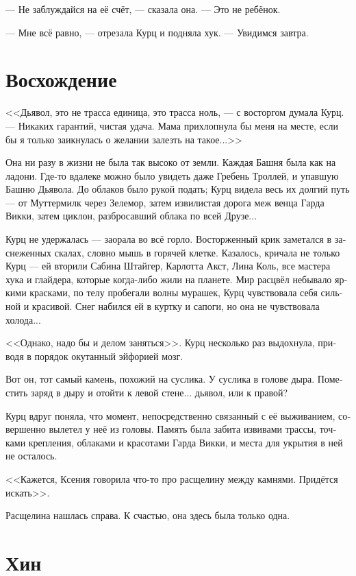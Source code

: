 \documentclass[a4paper,12pt,fleqn]{book}\usepackage{cooltooltips}\usepackage{polyglossia}\setdefaultlanguage[babelshorthands=true]{russian}\setotherlanguage{english}\defaultfontfeatures{Ligatures=TeX,Mapping=tex-text} \usepackage{xcolor}\definecolor{lightgray}{HTML}{bbbbbb}\color{lightgray}\newcommand{\ml}[3]{\textenglish{\textcolor{black}{#3}}}
\newcommand{\asterism}{\vspace{1em}{\centering\Large\bfseries$\ast~\ast~\ast$\par}\vspace{1em}}
\begin{document}
--- Не заблуждайся на её счёт, --- сказала она.
--- Это не ребёнок.

--- Мне всё равно, --- отрезала Курц и подняла хук.
--- Увидимся завтра.

\section{Восхождение}

<<Дьявол, это не трасса единица, это трасса ноль, --- с восторгом думала Курц.
--- Никаких гарантий, чистая удача.
Мама прихлопнула бы меня на месте, если бы я только заикнулась о желании залезть на такое...>>

\asterism

Она ни разу в жизни не была так высоко от земли.
Каждая Башня была как на ладони.
Где-то вдалеке можно было увидеть даже Гребень Троллей, и упавшую Башню Дьявола.
До облаков было рукой подать;
Курц видела весь их долгий путь --- от Муттермилк через Зелемор, затем извилистая дорога меж венца Гарда Викки, затем циклон, разбросавший облака по всей Друзе...

Курц не удержалась --- заорала во всё горло.
Восторженный крик заметался в заснеженных скалах, словно мышь в горячей клетке.
Казалось, кричала не только Курц --- ей вторили Сабина Штайгер, Карлотта Акст, Лина Коль, все мастера хука и глайдера, которые когда-либо жили на планете.
Мир расцвёл небывало яркими красками, по телу пробегали волны мурашек, Курц чувствовала себя сильной и красивой.
Снег набился ей в куртку и сапоги, но она не чувствовала холода...

<<Однако, надо бы и делом заняться>>.
Курц несколько раз выдохнула, приводя в порядок окутанный эйфорией мозг.

Вот он, тот самый камень, похожий на суслика.
У суслика в голове дыра.
Поместить заряд в дыру и отойти к левой стене... дьявол, или к правой?

Курц вдруг поняла, что момент, непосредственно связанный с её выживанием, совершенно вылетел у неё из головы.
Память была забита извивами трассы, точками крепления, облаками и красотами Гарда Викки, и места для укрытия в ней не осталось.

<<Кажется, Ксения говорила что-то про расщелину между камнями.
Придётся искать>>.

Расщелина нашлась справа.
К счастью, она здесь была только одна.

\section{Хин}
\end{document}
